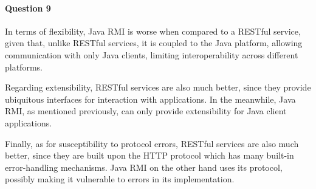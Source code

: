 \documentclass{ds-report}
\begin{document}
    \paragraph{Question 9}

    In terms of flexibility, Java RMI is worse when compared to a RESTful service, given that, unlike RESTful services, it is coupled to the Java platform, allowing communication with only Java clients, limiting interoperability across different platforms.

    Regarding extensibility, RESTful services are also much better, since they provide ubiquitous interfaces for interaction with applications. In the meanwhile, Java RMI, as mentioned previously, can only provide extensibility for Java client applications.

    Finally, as for susceptibility to protocol errors, RESTful services are also much better, since they are built upon the HTTP protocol which has many built-in error-handling mechanisms. Java RMI on the other hand uses its protocol, possibly making it vulnerable to errors in its implementation.

\end{document}
